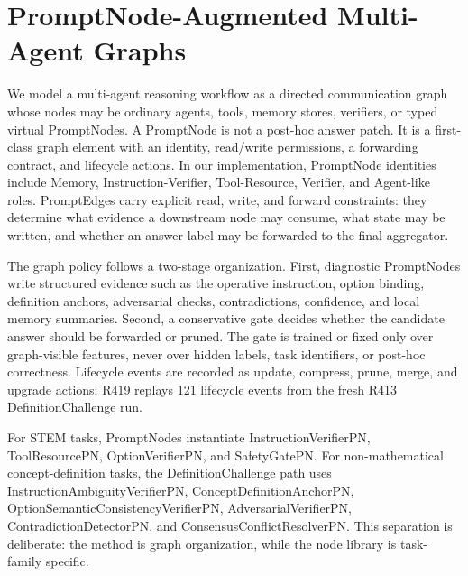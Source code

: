 \section{PromptNode-Augmented Multi-Agent Graphs}
\label{sec:method}

We model a multi-agent reasoning workflow as a directed communication graph whose nodes may be ordinary agents, tools, memory stores, verifiers, or typed virtual PromptNodes. A PromptNode is not a post-hoc answer patch. It is a first-class graph element with an identity, read/write permissions, a forwarding contract, and lifecycle actions. In our implementation, PromptNode identities include Memory, Instruction-Verifier, Tool-Resource, Verifier, and Agent-like roles. PromptEdges carry explicit read, write, and forward constraints: they determine what evidence a downstream node may consume, what state may be written, and whether an answer label may be forwarded to the final aggregator.

The graph policy follows a two-stage organization. First, diagnostic PromptNodes write structured evidence such as the operative instruction, option binding, definition anchors, adversarial checks, contradictions, confidence, and local memory summaries. Second, a conservative gate decides whether the candidate answer should be forwarded or pruned. The gate is trained or fixed only over graph-visible features, never over hidden labels, task identifiers, or post-hoc correctness. Lifecycle events are recorded as update, compress, prune, merge, and upgrade actions; R419 replays 121 lifecycle events from the fresh R413 DefinitionChallenge run.

For STEM tasks, PromptNodes instantiate InstructionVerifierPN, ToolResourcePN, OptionVerifierPN, and SafetyGatePN. For non-mathematical concept-definition tasks, the DefinitionChallenge path uses InstructionAmbiguityVerifierPN, ConceptDefinitionAnchorPN, OptionSemanticConsistencyVerifierPN, AdversarialVerifierPN, ContradictionDetectorPN, and ConsensusConflictResolverPN. This separation is deliberate: the method is graph organization, while the node library is task-family specific.
